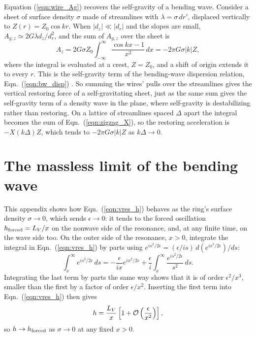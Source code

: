 \documentclass[twocolumn]{aastex702}
\begin{document}
Equation (\ref{eqn:wire_Ag}) recovers the self-gravity of a bending wave. Consider a sheet of
surface density $\sigma$ made of streamlines with $\lambda = \sigma\,dr'$, displaced vertically to
$Z(r) = Z_0\cos kr$. When $|d_z| \ll |d_r|$ and the slopes are small,
$A_{g,z} \simeq 2G\lambda d_z/d_r^2$, and the sum of $A_{g,z}$ over the sheet is
\begin{equation}
    \label{eqn:wire_sheet}
    A_z = 2G\sigma Z_0\int_{-\infty}^{\infty}\frac{\cos kx - 1}{x^2}\,dx = -2\pi G\sigma|k|Z,
\end{equation}
where the integral is evaluated at a crest, $Z = Z_0$, and a shift of origin extends it to every $r$. This is the
self-gravity term of the bending-wave dispersion relation, Eqn.\ (\ref{eqn:bw_disp}) \citep{SCL83, S84}. So summing
the wires' pulls over the streamlines gives the vertical restoring force of a self-gravitating sheet, just as the same
sum gives the self-gravity term of a density wave in the plane, where self-gravity is destabilizing rather than
restoring. On a lattice of streamlines spaced $\Delta$ apart the integral becomes the sum of
Eqn.\ (\ref{eqn:zigzag_X}), so the restoring acceleration is $-X(k\Delta)Z$, which tends to $-2\pi G\sigma|k|Z$ as
$k\Delta \rightarrow 0$.

\section{The massless limit of the bending wave}
\label{sec:massless_limit}
\setcounter{equation}{0}

This appendix shows how Eqn.\ (\ref{eqn:vres_h}) behaves as the ring's surface density $\sigma \rightarrow 0$, which
sends $\epsilon \rightarrow 0$: it tends to the forced oscillation $h_{\rm forced} = L_V/x$ on the nonwave side of the
resonance, and, at any finite time, on the wave side too. On the outer side of the resonance,
$x > 0$, integrate the integral in Eqn.\ (\ref{eqn:vres_h}) by parts using
$e^{is^2/2\epsilon} = (\epsilon/is)\,d(e^{is^2/2\epsilon})/ds$:
\begin{equation}
    \label{eqn:limit_parts}
    \int_x^\infty e^{is^2/2\epsilon}\,ds = -\frac{\epsilon}{ix}e^{ix^2/2\epsilon}
        + \frac{\epsilon}{i}\int_x^\infty \frac{e^{is^2/2\epsilon}}{s^2}\,ds.
\end{equation}
Integrating the last term by parts the same way shows that it is of order $\epsilon^2/x^3$, smaller than the
first by a factor of order $\epsilon/x^2$. Inserting the first term into Eqn.\ (\ref{eqn:vres_h}) then gives
\begin{equation}
    \label{eqn:limit_outer}
    h = \frac{L_V}{x}\left[1 + {\cal O}\left(\frac{\epsilon}{x^2}\right)\right],
\end{equation}
so $h \rightarrow h_{\rm forced}$ as $\sigma \rightarrow 0$ at any fixed $x > 0$.
\end{document}

